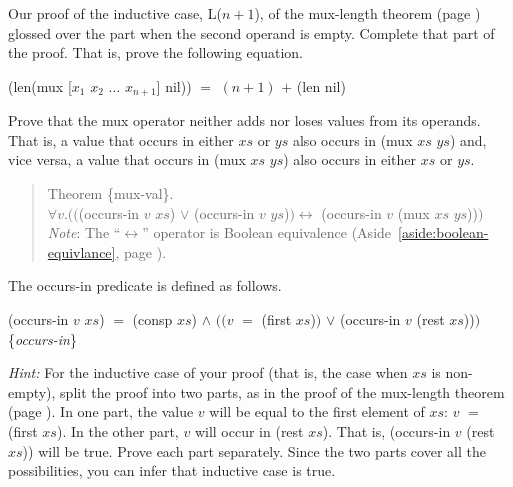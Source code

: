 \begin{ExerciseList}
\Exercise
Our proof of the inductive case, L($n+1$), of the mux-length theorem
(page \pageref{mux-length-thm-induc-case})
glossed over the part when the second operand is empty.
Complete that part of the proof. That is, prove the following equation.

\hspace{1cm} \textsf{(len(mux [$x_1$ $x_2$ $\dots$ $x_{n+1}$] nil)) $=$ $(n+1)$ $+$ (len nil)}

\Exercise [label={ex:mul-val-thm}]
Prove that the \textsf{mux} operator neither adds nor loses values from its operands.
That is, a value that occurs in either $xs$ or $ys$ also occurs in \textsf{(mux $xs$ $ys$)}
and, vice versa, a value that occurs in \textsf{(mux $xs$ $ys$)} also occurs in either $xs$ or $ys$.

\begin{quote}
\label{thm:mux-val}
Theorem \{mux-val\}.\\
$\forall v.(($\textsf{(occurs-in $v$ $xs$)} $\vee$ \textsf{(occurs-in $v$ $ys$)}$) \leftrightarrow$ \textsf{(occurs-in $v$ (mux $xs$ $ys$))}$)$ \\
\emph{Note}: The ``$\leftrightarrow$'' operator
is Boolean equivalence (Aside~\ref{aside:boolean-equivlance}, page \pageref{aside:boolean-equivlance}).
\end{quote}

The occurs-in predicate is defined as
follows.
\begin{center}
\label{def:occurs-in}
\textsf{(occurs-in $v$ $xs$)} $=$ \textsf{(consp $xs$)} $\wedge$ $((v$ $=$ \textsf{(first $xs$)}$)$ $\vee$ \textsf{(occurs-in $v$ (rest $xs$))}$)$ ~ \{\emph{occurs-in}\}
\end{center}

\emph{Hint:} For the inductive case of your proof
(that is, the case when $xs$ is non-empty),
split the proof into two parts,
as in the proof of the mux-length theorem (page \pageref{mux-length-thm}).
In one part, the value $v$ will be equal to
the first element of $xs$:
$v$ $=$ \textsf{(first $xs$)}.
In the other part, $v$ will occur in \textsf{(rest $xs$)}.
That is, \textsf{(occurs-in $v$ (rest $xs$))} will be true.
Prove each part separately.
Since the two parts cover all the possibilities,
you can infer that inductive case is true.


\end{ExerciseList}
